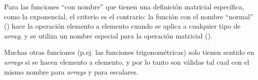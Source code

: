 Para las funciones ``con nombre'' que tienen una definición matricial específica, como la exponencial, el criterio es el contrario: la función con el nombre ``normal'' () hace la operación elemento a elemento cuando se aplica a cualquier tipo de \emph{array}; y se utiliza un nombre especial para la operación matricial ().

Muchas otras funciones (p.ej. las funciones trigonométricas) solo tienen sentido en \emph{arrays} si se hacen elemento a elemento, y por lo tanto son válidas tal cual con el mismo nombre para \emph{arrays} y para escalares.



